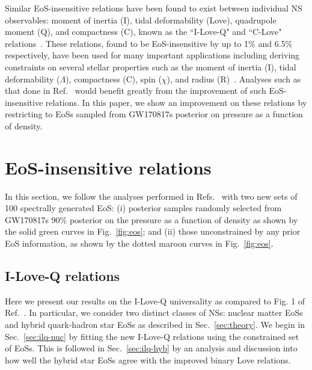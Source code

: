 \documentclass[prd,twocolumn,nofootinbib,superscriptaddress,amsmath,amssymb]{revtex4-1}
\begin{document}
Similar EoS-insensitive relations have been found to exist between individual NS observables: moment of inertia (I), tidal deformability (Love), quadrupole moment (Q), and compactness (C), known as the ``I-Love-Q" and ``C-Love" relations~\cite{Yagi:ILQ, Yagi:binLove}.
These relations, found to be EoS-insensitive by up to 1\% and 6.5\% respectively, have been used for many important applications including deriving constraints on several stellar properties such as the moment of inertia (I), tidal deformability ($\Lambda$), compactness (C), spin ($\chi$), and radius (R)~\cite{Kumar:2019xgp}.
Analyses such as that done in Ref.~\cite{Kumar:2019xgp} would benefit greatly from the improvement of such EoS-insensitive relations.
In this paper, we show an improvement on these relations by restricting to EoSs sampled from GW170817s posterior on pressure as a function of density.


\section{EoS-insensitive relations}
\label{sec:universal}

In this section, we follow the analyses performed in Refs.~\cite{Yagi:binLove,Yagi:ILQ} with two new sets of 100 spectrally generated EoS: (i) posterior samples randomly selected from GW170817s 90\% posterior on the pressure as a function of density as shown by the solid green curves in Fig.~\ref{fig:eos}; and (ii) those unconstrained by any prior EoS information, as shown by the dotted maroon curves in Fig.~\ref{fig:eos}.


\subsection{I-Love-Q relations}
\label{sec:ilq}

Here we present our results on the I-Love-Q universality as compared to Fig. 1 of Ref.~\cite{Yagi:ILQ}.
In particular, we consider two distinct classes of NSs: nuclear matter EoSs and hybrid quark-hadron star EoSs as described in Sec.~\ref{sec:theory}.
We begin in Sec.~\ref{sec:ilq-nuc} by fitting the new I-Love-Q relations using the constrained set of EoSs.
This is followed in Sec.~\ref{sec:ilq-hyb} by an analysis and discussion into how well the hybrid star EoSs agree with the improved binary Love relations. 
\end{document}
